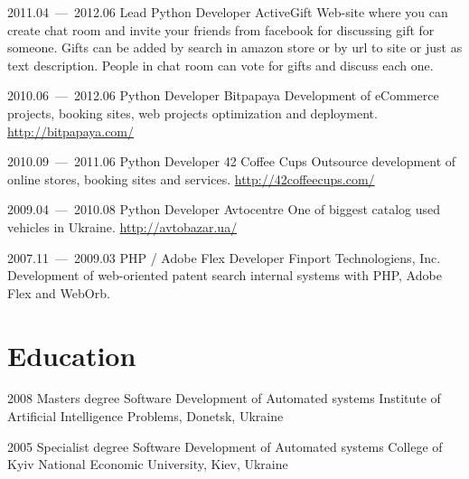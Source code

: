 \documentclass[11pt,a4paper,oneside]{moderncv}
\begin{document}
        \cventry
            {2011.04~--–~2012.06}
            {Lead Python Developer}
            {ActiveGift}
            {}{}
            {
              Web-site where you can create chat room and invite your friends from facebook for discussing gift for someone. Gifts can be added by search in amazon store or by url to site or just as text description. People in chat room can vote for gifts and discuss each one.
            }

        \cventry
            {2010.06~--–~2012.06}
            {Python Developer}
            {Bitpapaya}
            {}{}
            {
                Development of eCommerce projects, booking sites, web projects optimization and deployment. \url{http://bitpapaya.com/}
            }

        \cventry
            {2010.09~--–~2011.06}
            {Python Developer}
            {42 Coffee Cups}
            {}{}
            {
                Outsource development of online stores, booking sites and services. \url{http://42coffeecups.com/}
            }

        \cventry
            {2009.04~--–~2010.08}
            {Python Developer}
            {Avtocentre}
            {}{}
            {
                One of biggest catalog used vehicles in Ukraine. \url{http://avtobazar.ua/}
            }

        \cventry
            {2007.11~--–~2009.03}
            {PHP / Adobe Flex Developer}
            {Finport Technologiens, Inc.}
            {}{}
            {
                Development of web-oriented patent search internal systems with PHP, Adobe Flex and WebOrb.
            }

    \section{Education}
        \cventry
            {2008}
            {Masters degree}
            {Software Development of Automated systems}
            {Institute of Artificial Intelligence Problems, Donetsk, Ukraine}
            {}{}

        \cventry
            {2005}
            {Specialist degree}
            {Software Development of Automated systems}
            {College of Kyiv National Economic University, Kiev, Ukraine}
            {}{}
\end{document}
